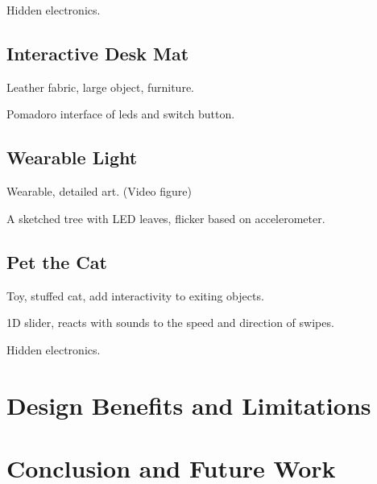 \documentclass[header.tex]{subfiles}
\begin{document}
Hidden electronics.

\subsection{Interactive Desk Mat}
Leather fabric, large object, furniture.

Pomadoro interface of leds and switch button.
\subsection{Wearable Light}
Wearable, detailed art. (Video figure)

A sketched tree with LED leaves, flicker based on accelerometer.
\subsection{Pet the Cat}
Toy, stuffed cat, add interactivity to exiting objects. 

1D slider, reacts with sounds to the speed and direction of swipes.

Hidden electronics.





\section{Design Benefits and Limitations}







\section{Conclusion and Future Work}
\balance{}



\end{document}
